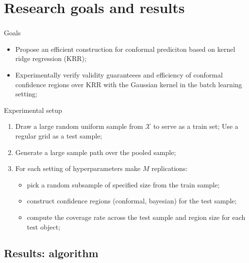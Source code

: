 \documentclass[t]{beamer}  %
\newcommand{\Xcal}{\mathcal{X}}
\begin{document}


\section{Research goals and results} %
\label{sec:research_goals_and_results}

\begin{frame}[c, shrink=10]\frametitle{\insertsection}
  \begin{block}{Goals}
    \begin{itemize}
      \item Propose an efficient construction for conformal prediciton based on
      kernel ridge regression (KRR);
      \item Experimentally verify validity guaranteees and efficiency of conformal
      confidence regions over KRR with the Gaussian kernel in the batch learning
      setting;
    \end{itemize}
  \end{block}

  \begin{block}{Experimental setup}
    \begin{enumerate}
      \item Draw a large random uniform sample from $\Xcal$ to serve as a train set;
        Use a regular grid as a test sample;
      \item Generate a large sample path over the pooled sample;
      \item For each setting of hyperparameters make $M$ replications: \begin{itemize}
        \item pick a random subsample of specified size from the train sample;
        \item construct confidence regions (conformal, bayesian) for the test sample;
        \item compute the coverage rate across the test sample and region size for each test object;
      \end{itemize}
    \end{enumerate}
  \end{block}
\end{frame}

\subsection{Results: algorithm} %
\label{sub:results_algorithm}
\end{document}
